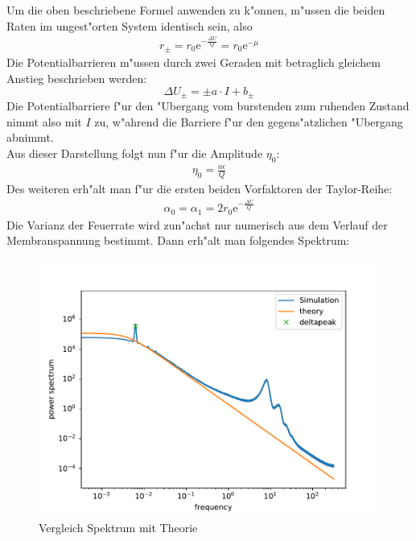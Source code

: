 \documentclass[12pt,a4paper]{article}
\begin{document}
Um die oben beschriebene Formel anwenden zu k"onnen, m"ussen die beiden Raten im ungest"orten System identisch sein, also
\begin{eqnarray}
r_{\pm}=r_0\text{e}^{-\frac{\Delta U}{Q}}=r_0\text{e}^{-\mu}
\end{eqnarray}
Die Potentialbarrieren m"ussen durch zwei Geraden mit betraglich gleichem Anstieg beschrieben werden:
\begin{equation}
	\Delta U_\pm=\pm a\cdot I +b_\pm
\end{equation}
Die Potentialbarriere f"ur den "Ubergang vom burstenden zum ruhenden Zustand nimmt also mit $I$ zu, w"ahrend die Barriere f"ur den gegens"atzlichen "Ubergang abnimmt.\\
Aus dieser Darstellung folgt nun f"ur die Amplitude $\eta_0$:
\begin{eqnarray}
\eta_0=\frac{a\epsilon}{Q}
\end{eqnarray} 
Des weiteren erh"alt man f"ur die ersten beiden Vorfaktoren der Taylor-Reihe:
\begin{align*}
\alpha_0=\alpha_1=2r_0\text{e}^{-\frac{\Delta U}{Q}}
\end{align*}
Die Varianz der Feuerrate wird zun"achst nur numerisch aus dem Verlauf der Membranspannung bestimmt. Dann erh"alt man folgendes Spektrum:
\begin{figure}[H]
	\centering
	\includegraphics[scale=0.9]{inapik8je1long3011wfom4.pdf}
	\caption{Vergleich Spektrum mit Theorie}
	\label{spectcomp}
\end{figure}
\end{document}
